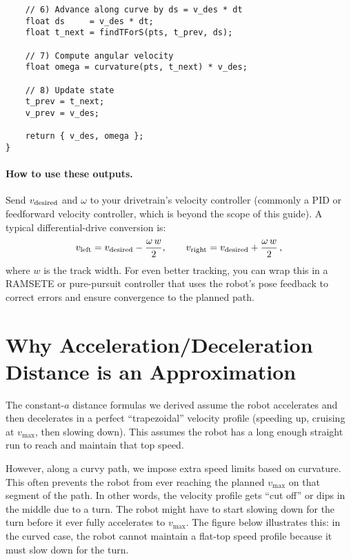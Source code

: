 \documentclass[11pt]{article}
\begin{document}
\begin{lstlisting}
    // 6) Advance along curve by ds = v_des * dt
    float ds     = v_des * dt;
    float t_next = findTForS(pts, t_prev, ds);

    // 7) Compute angular velocity
    float omega = curvature(pts, t_next) * v_des;

    // 8) Update state
    t_prev = t_next;
    v_prev = v_des;

    return { v_des, omega };
}

\end{lstlisting}

\paragraph{How to use these outputs.} Send \(v_{\rm desired}\) and \(\omega\) to your drivetrain’s velocity controller (commonly a PID or feedforward velocity controller, which is beyond the scope of this guide). A typical differential-drive conversion is:
\[
v_{\rm left}  = v_{\rm desired} - \frac{\omega\,w}{2},\qquad
v_{\rm right} = v_{\rm desired} + \frac{\omega\,w}{2}\,,
\] 
where $w$ is the track width. For even better tracking, you can wrap this in a RAMSETE or pure-pursuit controller that uses the robot’s pose feedback to correct errors and ensure convergence to the planned path.

\section{Why Acceleration/Deceleration Distance is an Approximation}

The constant-$a$ distance formulas we derived assume the robot accelerates and then decelerates in a perfect “trapezoidal” velocity profile (speeding up, cruising at $v_{\max}$, then slowing down). This assumes the robot has a long enough straight run to reach and maintain that top speed.

However, along a curvy path, we impose extra speed limits based on curvature. This often prevents the robot from ever reaching the planned $v_{\max}$ on that segment of the path. In other words, the velocity profile gets “cut off” or dips in the middle due to a turn. The robot might have to start slowing down for the turn before it ever fully accelerates to $v_{\max}$. The figure below illustrates this: in the curved case, the robot cannot maintain a flat-top speed profile because it must slow down for the turn.

\end{document}
